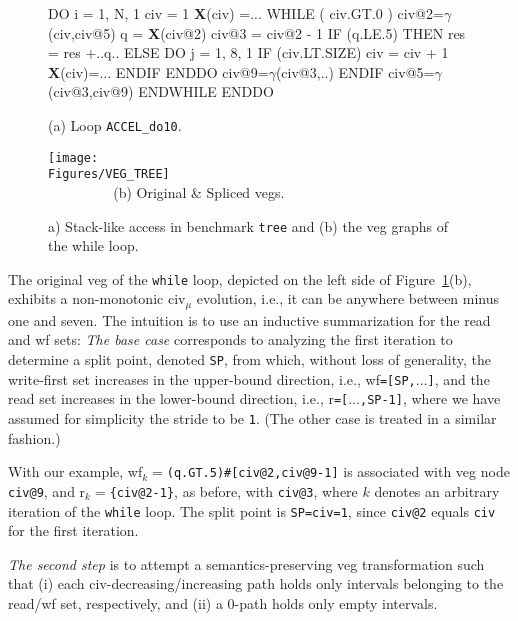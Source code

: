 \documentclass[10pt,nocopyrightspace]{sigplanconf}
\newcommand{\mymath}[1]{$ #1 $}
\newcommand{\Figures}[1]{../Figures/}
\begin{document}
\begin{figure}
\begin{minipage}{0.4\columnwidth}
\begin{colorcode}
DO i = 1, N, 1
 civ = 1
 {\bf{}X}(civ) =...
 WHILE ( civ.GT.0 )
  civ@2=\mymath{\gamma}(civ,civ@5)
  q = {\bf X}(civ@2)
  civ@3 = civ@2 - 1
  IF (q.LE.5) THEN
   res = res +..q..
  ELSE
   DO j = 1, 8, 1
    IF (civ.LT.SIZE) 
      civ = civ + 1
      {\bf{}X}(civ)=...
   ENDIF ENDDO
   civ@9=\mymath{\gamma}(civ@3,..)
  ENDIF
  civ@5=\mymath{\gamma}(civ@3,civ@9)
ENDWHILE ENDDO   
\end{colorcode}
\vspace{-1ex}
(a) Loop {\tt ACCEL\_do10}.
\end{minipage}
\begin{minipage}{0.56\columnwidth}
\texttt{[image: \\Figures/VEG\_TREE]}\\
$\mbox{ }\mbox{ }\mbox{ }\mbox{ }\mbox{ }\mbox{ }\mbox{ }$(b) Original \& Spliced {\sc veg}s.
\end{minipage}
\caption{a) Stack-like access in benchmark {\tt tree} and (b) the {\sc veg} graphs of the while loop.}
\vspace{-1ex}
\label{fig:Tree} %
\end{figure}


The original {\sc veg} of the {\tt while} loop, depicted on the left 
side of Figure~\ref{fig:Tree}(b), exhibits a non-monotonic {\sc civ}$_\mu$
evolution, i.e., it can be anywhere between minus one and seven.
%
The intuition is to use an inductive summarization for the read and {\sc wf} sets:
{\em The base case} corresponds to analyzing the first iteration to determine a split point, 
denoted {\tt SP}, from which, without loss of generality, the write-first set increases in the 
upper-bound direction, i.e., {\sc wf}{\tt=[SP,$\ldots$]}, and the read set increases 
in the lower-bound direction, i.e., {\sc r}{\tt=[$\ldots$,SP-1]}, where we 
have assumed for simplicity the stride to be {\tt 1}.
(The other case is treated in a similar fashion.)

With our example, {\sc wf}$_k=${\tt (q.GT.5)\#[civ@2,civ@9-1]}
is associated with {\sc veg} node {\tt civ@9}, and 
{\sc r}$_k=${\tt \{civ@2-1\}}, as before, with {\tt civ@3}, 
where $k$ denotes an arbitrary iteration of the {\tt while} loop.
The split point is {\tt SP=civ=1}, since {\tt civ@2} equals {\tt civ} 
for the first iteration.

{\em The second step} is to attempt a semantics-preserving {\sc veg} transformation
such that (i) each {\sc civ}-decreasing/increasing path holds only intervals 
belonging to the read/{\sc wf} set, respectively, and (ii) a $0$-path holds
only empty intervals.
\end{document}
